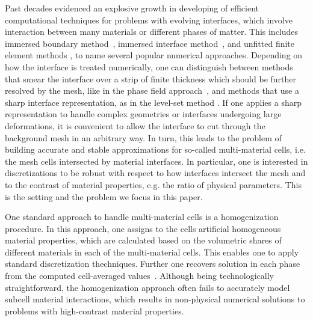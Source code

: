 \documentclass[12pt]{article}
\begin{document}
	Past decades evidenced an explosive growth in developing of efficient computational techniques for problems with evolving interfaces, which involve interaction between many materials or different phases of matter. This includes immersed boundary method~\cite{peskin2002immersed}, immersed interface method~\cite{leveque1994immersed}, and unfitted finite element methods \cite{belytschko2009review,burman2015cutfem}, to name several popular numerical approaches. Depending on how the interface is treated numerically, one can distinguish between methods that smear the interface over a strip of finite thickness which should be further resolved by the mesh, like in the phase field approach~\cite{steinbach2009phase}, and methods that use a sharp interface representation, as in the level-set method \cite{sethian1999level}.  If one applies a sharp representation to handle complex geometries or interfaces undergoing large deformations, it is convenient to allow the  interface to cut through the background mesh in an arbitrary way. In turn, this leads to the problem of building accurate and stable approximations for  so-called multi-material cells, i.e. the mesh cells intersected by material interfaces. In particular, one is interested in discretizations to be robust with respect to how interfaces intersect the mesh and to the contrast of  material properties, e.g. the ratio of physical parameters. This is the setting and the problem  we focus in this paper.

	
One standard approach to handle  multi-material cells is a homogenization procedure. In this approach, one assigns to the cells  artificial homogeneous  material properties, which are calculated based on the volumetric shares of different materials in each of the multi-material cells. This enables one to apply standard discretization thechniques. %
Further one recovers solution in each phase from the computed cell-averaged values~\cite{dawes2013solving}.
Although being technologically straightforward, the homogenization approach often fails  to accurately model subcell material interactions, which results in non-physical numerical solutions to problems with high-contrast material properties.
\end{document}
